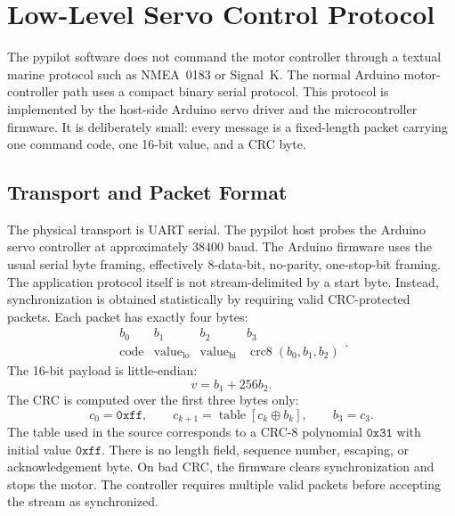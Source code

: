 \documentclass[11pt,twocolumn]{article}
\begin{document}
\section{Low-Level Servo Control Protocol}
\label{sec:servo-protocol}
The pypilot software does not command the motor controller through a
textual marine protocol such as NMEA~0183 or Signal~K.  The normal
Arduino motor-controller path uses a compact binary serial protocol.
This protocol is implemented by the host-side Arduino servo driver and
the microcontroller firmware.  It is deliberately small: every message is
a fixed-length packet carrying one command code, one 16-bit value, and a
CRC byte.
\subsection{Transport and Packet Format}
The physical transport is UART serial.  The pypilot host probes the
Arduino servo controller at approximately \(38400\) baud.  The Arduino
firmware uses the usual serial byte framing, effectively \(8\)-data-bit,
no-parity, one-stop-bit framing.  The application protocol itself is not
stream-delimited by a start byte.  Instead, synchronization is obtained
statistically by requiring valid CRC-protected packets.
Each packet has exactly four bytes:
\[
\begin{array}{c|c|c|c}
b_0 & b_1 & b_2 & b_3 \\
\hline
\text{code} & \text{value}_{\mathrm{lo}} &
\text{value}_{\mathrm{hi}} & \operatorname{crc8}(b_0,b_1,b_2)
\end{array}.
\]
The 16-bit payload is little-endian:
\[
v = b_1 + 256 b_2.
\]
The CRC is computed over the first three bytes only:
\[
c_0 = \mathtt{0xff},
\qquad
c_{k+1} =
\operatorname{table}\!\left[c_k \oplus b_k\right],
\qquad
b_3 = c_3 .
\]
The table used in the source corresponds to a CRC-8 polynomial
\(\mathtt{0x31}\) with initial value \(\mathtt{0xff}\).  There is no
length field, sequence number, escaping, or acknowledgement byte.  On bad
CRC, the firmware clears synchronization and stops the motor.  The
controller requires multiple valid packets before accepting the stream as
synchronized.
\end{document}
